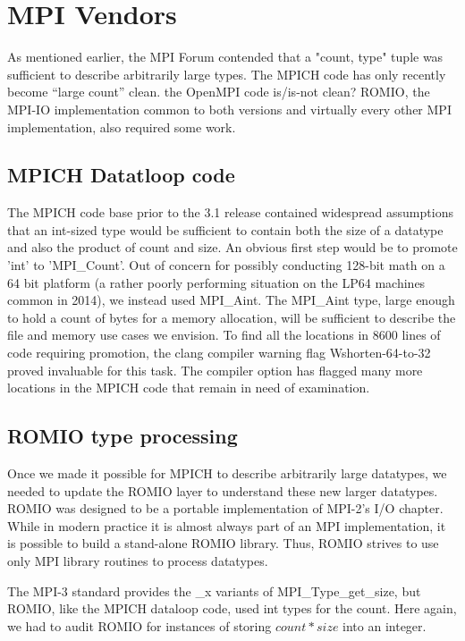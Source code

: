
\section{MPI Vendors}
As mentioned earlier, the MPI Forum contended that a "count, type"
tuple was sufficient to describe
arbitrarily large types.  The MPICH code has only recently become
``large count'' clean.  \todo the OpenMPI code is/is-not clean?  ROMIO, the
MPI-IO implementation common to both versions and virtually every other MPI
implementation, also required some work.

\subsection{MPICH Datatloop code}
The MPICH code base prior to the
3.1 release contained widespread assumptions that an int-sized type
would be sufficient to contain both the size of a datatype and also the product
of count and size.   An obvious first step would be to promote 'int' to 'MPI\_Count'.
Out of concern for possibly conducting 128-bit math on a 64 bit platform (a
rather poorly performing situation on the LP64 machines common in 2014),
we instead used MPI\_Aint.  The MPI\_Aint type, large enough to hold a
count of bytes for a memory allocation, will be sufficient to describe the file
and memory use cases we envision.  To find all the locations in 8600 lines of
code requiring promotion, the clang compiler warning flag
Wshorten-64-to-32 proved invaluable for this task.  The compiler option has
flagged many more
locations in the MPICH code that remain in need of examination.

\subsection{ROMIO type processing}

Once we made it possible for MPICH to describe arbitrarily large datatypes, we
needed to update the ROMIO layer to understand these new larger datatypes.
ROMIO \cite{thakur:mpi-io-implement} was designed to be a portable
 implementation of MPI-2's I/O
chapter.  While in modern practice it is almost always part of an MPI
implementation, it is possible to build a stand-alone ROMIO library.  Thus,
ROMIO strives to use only MPI library routines to process datatypes.

The MPI-3 standard provides the \_x variants of MPI\_Type\_get\_size, but
ROMIO, like the MPICH dataloop code, used int types for the count.
  Here again,  we had to audit ROMIO for instances of storing $count * size$
into an integer.

